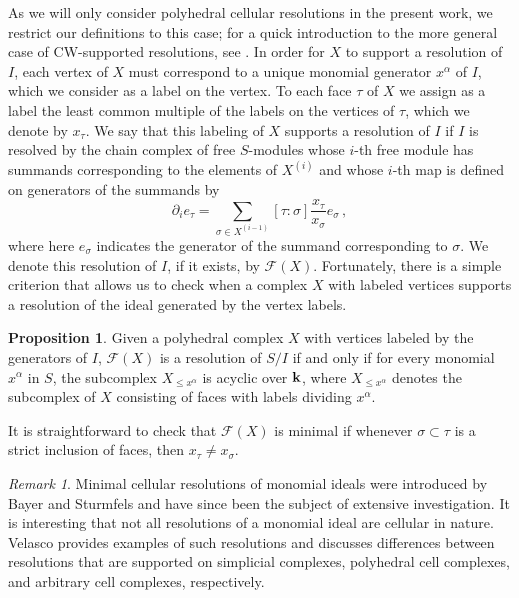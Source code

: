 \documentclass[11pt]{amsart}
\theoremstyle{definition}
\newtheorem{proposition}[theorem]{Proposition}
\numberwithin{equation}{section}
\theoremstyle{remark}
\newtheorem{remark}[theorem]{Remark}
\numberwithin{equation}{section}
\begin{document}
As we will only consider polyhedral cellular resolutions in the present work, we restrict our definitions to this case; for a quick introduction to the more general case of CW-supported resolutions, see \cite{BatziesWelker}.
In order for $X$ to support a resolution of $I$, each vertex of $X$ must correspond to a unique monomial generator $x^\alpha$ of $I$, which we consider as a label on the vertex.
To each face $\tau$ of $X$ we assign as a label the least common multiple of the labels on the vertices of $\tau$, which we denote by $x_\tau$.
We say that this labeling of $X$ supports a resolution of $I$ if $I$ is resolved by the chain complex of free $S$-modules whose $i$-th free module has summands corresponding to the elements of $X^{(i)}$ and whose $i$-th map is defined on generators of the summands by
\[\partial_ie_\tau = \sum_{\sigma\in X^{(i-1)}}[\tau:\sigma]\frac{x_{\tau}}{x_{\sigma}}e_{\sigma} \, ,\]
where here $e_{\sigma}$ indicates the generator of the summand corresponding to $\sigma$.
We denote this resolution of $I$, if it exists, by ${\mathcal{F}}(X)$.
Fortunately, there is a simple criterion that allows us to check when a complex $X$ with labeled vertices supports a resolution of the ideal generated by the vertex labels.

\begin{proposition}\label{acyclic}{\rm \cite[Proposition 4.5]{MillerSturmfels}} Given a polyhedral complex $X$ with vertices labeled by the generators of $I$, ${\mathcal{F}}(X)$ is a resolution of $S/I$ if and only if for every monomial $x^\alpha$ in $S$, the subcomplex $X_{\leq x^\alpha}$ is acyclic over ${{\bf k}}$, where $X_{\leq x^\alpha}$ denotes the subcomplex of $X$ consisting of faces with labels dividing $x^\alpha$.
\end{proposition}

It is straightforward to check that ${\mathcal{F}}(X)$ is minimal if whenever $\sigma\subset\tau$ is a strict inclusion of faces, then $x_{\tau}\neq x_{\sigma}$.

\begin{remark}
Minimal cellular resolutions of monomial ideals were introduced by Bayer and Sturmfels \cite{BayerSturmfels} and have since been the subject of extensive investigation.
It is interesting that not all resolutions of a monomial ideal are cellular in nature.
Velasco \cite{Velasco} provides examples of such resolutions and discusses differences between resolutions that are supported on simplicial complexes, polyhedral cell complexes, and arbitrary cell complexes, respectively.
\end{remark}
\end{document}
